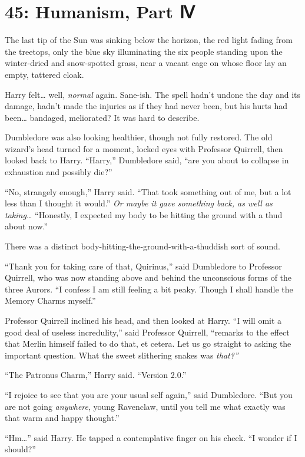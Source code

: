 \chapter{45: Humanism, Part Ⅳ}\label{humanism-part}

The last tip of the Sun was sinking below the horizon, the red light
fading from the treetops, only the blue sky illuminating the six people
standing upon the winter-dried and snow-spotted grass, near a vacant
cage on whose floor lay an empty, tattered cloak.

Harry felt\ldots{} well, \emph{normal} again. Sane-ish. The spell hadn't
undone the day and its damage, hadn't made the injuries as if they had
never been, but his hurts had been\ldots{} bandaged, meliorated? It was
hard to describe.

Dumbledore was also looking healthier, though not fully restored. The
old wizard's head turned for a moment, locked eyes with Professor
Quirrell, then looked back to Harry. ``Harry,'' Dumbledore said, ``are
you about to collapse in exhaustion and possibly die?''

``No, strangely enough,'' Harry said. ``That took something out of me,
but a lot less than I thought it would.'' \emph{Or maybe it gave
something back, as well as taking\ldots{}} ``Honestly, I expected my
body to be hitting the ground with a thud about now.''

There was a distinct body-hitting-the-ground-with-a-thuddish sort of
sound.

``Thank you for taking care of that, Quirinus,'' said Dumbledore to
Professor Quirrell, who was now standing above and behind the
unconscious forms of the three Aurors. ``I confess I am still feeling a
bit peaky. Though I shall handle the Memory Charms myself.''

Professor Quirrell inclined his head, and then looked at Harry. ``I will
omit a good deal of useless incredulity,'' said Professor Quirrell,
``remarks to the effect that Merlin himself failed to do that, et
cetera. Let us go straight to asking the important question. What the
sweet slithering snakes was \emph{that?''}

``The Patronus Charm,'' Harry said. ``Version 2.0.''

``I rejoice to see that you are your usual self again,'' said
Dumbledore. ``But you are not going \emph{anywhere}, young Ravenclaw,
until you tell me what exactly was that warm and happy thought.''

``Hm\ldots{}'' said Harry. He tapped a contemplative finger on his
cheek. ``I wonder if I should?''

